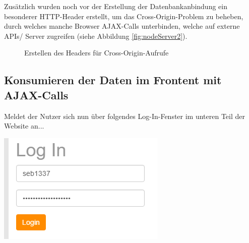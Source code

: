 Zusätzlich wurden noch vor der Erstellung der Datenbankanbindung ein besonderer HTTP-Header erstellt, um das Cross-Origin-Problem zu beheben, durch welches manche Browser AJAX-Calls unterbinden, welche auf externe APIs/ Server zugreifen (siehe Abbildung \vref{fig:nodeServer2}).

\begin{figure}[!h]
	\caption{Erstellen des Headers für Cross-Origin-Aufrufe}
	\label{fig:nodeServer2}
\end{figure}

\subsection{Konsumieren der Daten im Frontent mit AJAX-Calls}
\label{Konsumieren der Daten im Frontent mit AJAX-Calls}

Meldet der Nutzer sich nun über folgendes Log-In-Fenster im unteren Teil der Website an...

\includegraphics[scale=0.5]{img/logIn.png}

